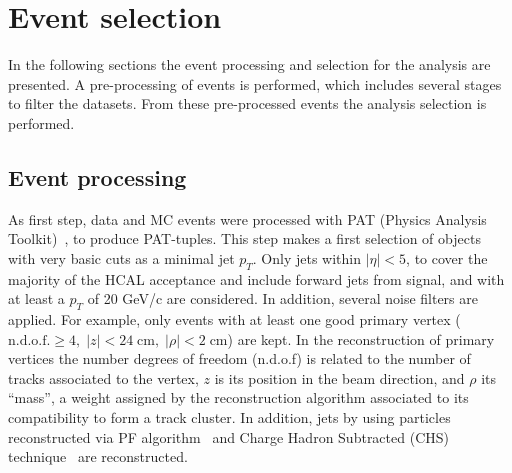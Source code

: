 

\section{Event selection}
\label{sec:sel}

In the following sections the event processing and selection for the analysis are presented. A pre-processing of events is performed, which includes several stages to filter the datasets. From these pre-processed events the analysis selection is performed.

\subsection{Event processing}

As first step, data and MC events were processed with PAT (Physics Analysis Toolkit)~\cite{Adam:2010zza}, to produce PAT-tuples. This step makes a first selection of objects with very basic cuts as a minimal jet $p_{T}$. Only jets within $|\eta|<5$, to cover the majority of the HCAL acceptance and include forward jets from signal, and with at least a $p_{T}$ of 20 GeV/c are considered. In addition, several noise filters are applied. For example, only events with at least one good primary vertex ($\text{n.d.o.f.} \ge 4,\; |z|<24 \;\text{cm},\; |\rho|< 2 \;\text{cm}$) are kept. In the reconstruction of primary vertices the number degrees of freedom (n.d.o.f) is related to the number of tracks associated to the vertex, $z$ is its position in the beam direction, and $\rho$ its ``mass'', a weight assigned by the reconstruction algorithm associated to its compatibility to form a track cluster. In addition, jets by using particles reconstructed via PF algorithm~\cite{CMS:2009nxa,CMS:2010eua,CMS:2010byl,CMS:2010aua} and Charge Hadron Subtracted (CHS) technique~\cite{Kirschenmann:1627818} are reconstructed. %


